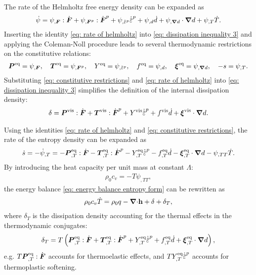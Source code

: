 The rate of the Helmholtz free energy density can be expanded as
\begin{align}
  \dot{\psi} = \psi_{,\defgrad}:\dot{\defgrad} + \psi_{,\defgrad^p}:\dot{\defgrad}^p + \psi_{,\ep}\epdot + \psi_{,d}\dot{d} + \psi_{,\grad d}\cdot\grad d + \psi_{,T}\dot{T}. \label{eq: rate of helmholtz}
\end{align}
Inserting the identity \eqref{eq: rate of helmholtz} into \eqref{eq: dissipation inequality 3} and applying the Coleman-Noll procedure leads to several thermodynamic restrictions on the constitutive relations:
\begin{align}
  \bfP^\text{eq} = \psi_{,\defgrad}, \quad \bfT^\text{eq} = \psi_{,\defgrad^p}, \quad Y^\text{eq} = \psi_{,\ep}, \quad f^\text{eq} = \psi_{,d}, \quad \bs{\xi}^\text{eq} = \psi_{,\grad d}, \quad -s = \psi_{,T}. \label{eq: constitutive restrictions}
\end{align}
Substituting \eqref{eq: constitutive restrictions} and \eqref{eq: rate of helmholtz} into \eqref{eq: dissipation inequality 3} simplifies the definition of the internal dissipation density:
\begin{align}
  \delta = \bfP^\text{vis}:\dot{\defgrad} + \bfT^\text{vis}:\dot{\defgrad}^p + Y^\text{vis}\epdot + f^\text{vis}\dot{d} + \bs{\xi}^\text{vis}\cdot\grad d.
\end{align}

Using the identities \eqref{eq: rate of helmholtz} and \eqref{eq: constitutive restrictions}, the rate of the entropy density can be expanded as
\begin{align}
  \dot{s} = -\dot{\psi}_{,T} = - \bfP^\text{eq}_{,T}:\dot{\defgrad} - \bfT^\text{eq}_{,T}:\dot{\defgrad}^p - Y^\text{eq}_{,T}\epdot - f^\text{eq}_{,T}\dot{d} - \bs{\xi}^\text{eq}_{,T}\cdot\grad d - \psi_{,TT} \dot{T}. \label{eq: expanding s dot}
\end{align}
By introducing the heat capacity per unit mass at constant $\Lambda$:
\begin{align}
  \rho_0c_v = -T\psi_{,TT}, \label{eq: heat capacity}
\end{align}
the energy balance \eqref{eq: energy balance entropy form} can be rewritten as
\begin{align}
  \rho_0 c_v \dot{T} = \rho_0 q - {\boldsymbol{\nabla} \cdot} \textbf{h} + \delta + \delta_T, \label{eq: energy balance temperature form}
\end{align}
where $\delta_T$ is the dissipation density accounting for the thermal effects in the thermodynamic conjugates:
\begin{align}
  \delta_T = T\left( \bfP^\text{eq}_{,T}:\dot{\defgrad} + \bfT^\text{eq}_{,T}:\dot{\defgrad}^p + Y^\text{eq}_{,T}\epdot + f^\text{eq}_{,T}\dot{d} + \bs{\xi}^\text{eq}_{,T}\cdot\grad d \right), \label{eq: heat generation due to energetic terms}
\end{align}
e.g. $T\boldsymbol{P}^\text{eq}_{,T}:\dot{\boldsymbol{F}}$ accounts for thermoelastic effects, and $TY^\text{eq}_{,T}\epdot$ accounts for thermoplastic softening.
